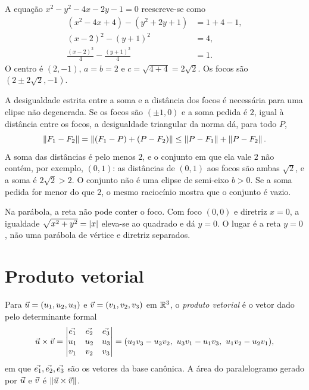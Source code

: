 \documentclass[11pt,a4paper]{article}
\begin{document}
\begin{exemplo}
A equação $x^2-y^2-4x-2y-1=0$ reescreve-se como
\begin{align*}
(x^2-4x+4)-(y^2+2y+1)&=1+4-1,\\
(x-2)^2-(y+1)^2&=4,\\
\frac{(x-2)^2}{4}-\frac{(y+1)^2}{4}&=1.
\end{align*}
O centro é $(2,-1)$, $a=b=2$ e $c=\sqrt{4+4}=2\sqrt{2}$. Os focos são $(2\pm 2\sqrt{2},-1)$.
\end{exemplo}


\begin{contraexemplo}
A desigualdade estrita entre a soma e a distância dos focos é necessária para uma elipse não degenerada. Se os focos são $(\pm 1,0)$ e a soma pedida é $2$, igual à distância entre os focos, a desigualdade triangular da norma dá, para todo $P$,
\[
\left\lVert F_1-F_2 \right\rVert=\left\lVert (F_1-P)+(P-F_2) \right\rVert\le\left\lVert P-F_1 \right\rVert+\left\lVert P-F_2 \right\rVert.
\]
A soma das distâncias é pelo menos $2$, e o conjunto em que ela vale $2$ não contém, por exemplo, $(0,1)$: as distâncias de $(0,1)$ aos focos são ambas $\sqrt{2}$, e a soma é $2\sqrt{2}>2$. O conjunto não é uma elipse de semi-eixo $b>0$. Se a soma pedida for menor do que $2$, o mesmo raciocínio mostra que o conjunto é vazio.

Na parábola, a reta não pode conter o foco. Com foco $(0,0)$ e diretriz $x=0$, a igualdade $\sqrt{x^2+y^2}=\left\lvert x \right\rvert$ eleva-se ao quadrado e dá $y=0$. O lugar é a reta $y=0$, não uma parábola de vértice e diretriz separados.
\end{contraexemplo}

\section{Produto vetorial}

\begin{definicao}
Para $\vec{u}=(u_1,u_2,u_3)$ e $\vec{v}=(v_1,v_2,v_3)$ em $\mathbb{R}^3$, o \emph{produto vetorial} é o vetor dado pelo determinante formal
\[
\vec{u}\times\vec{v}
=
\begin{vmatrix}
\vec{e_1}&\vec{e_2}&\vec{e_3}\\
u_1&u_2&u_3\\
v_1&v_2&v_3
\end{vmatrix}
=(u_2v_3-u_3v_2,\ u_3v_1-u_1v_3,\ u_1v_2-u_2v_1),
\]
em que $\vec{e_1},\vec{e_2},\vec{e_3}$ são os vetores da base canônica. A área do paralelogramo gerado por $\vec{u}$ e $\vec{v}$ é $\left\lVert \vec{u}\times\vec{v} \right\rVert$.
\end{definicao}
\end{document}
